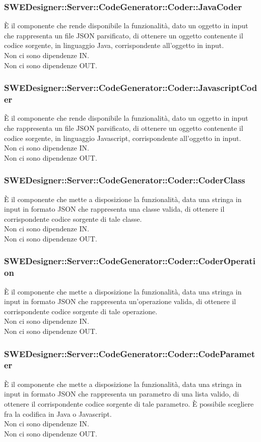 \documentclass[../PianoDiQualifica.tex]{subfiles}
\begin{document}
		\subsubsection{SWEDesigner::Server::CodeGenerator::Coder::JavaCoder}
		È il componente che rende disponibile la funzionalità, dato un oggetto in input che rappresenta un file JSON parsificato, di ottenere un oggetto contenente il codice sorgente, in linguaggio Java, corrispondente all'oggetto in input.\\
		Non ci sono dipendenze IN.\\
		Non ci sono dipendenze OUT.
		\subsubsection{SWEDesigner::Server::CodeGenerator::Coder::JavascriptCoder}
		È il componente che rende disponibile la funzionalità, dato un oggetto in input che rappresenta un file JSON parsificato, di ottenere un oggetto contenente il codice sorgente, in linguaggio Javascript, corrispondente all'oggetto in input.\\
		Non ci sono dipendenze IN.\\
		Non ci sono dipendenze OUT.
		\subsubsection{SWEDesigner::Server::CodeGenerator::Coder::CoderClass}
		È il componente che mette a disposizione la funzionalità, data una stringa in input in formato JSON che rappresenta una classe valida, di ottenere il corrispondente codice sorgente di tale classe.\\
		Non ci sono dipendenze IN.\\
		Non ci sono dipendenze OUT.
		\subsubsection{SWEDesigner::Server::CodeGenerator::Coder::CoderOperation}
		È il componente che mette a disposizione la funzionalità, data una stringa in input in formato JSON che rappresenta un'operazione valida, di ottenere il corrispondente codice sorgente di tale operazione.\\
		Non ci sono dipendenze IN.\\
		Non ci sono dipendenze OUT.
		\subsubsection{SWEDesigner::Server::CodeGenerator::Coder::CodeParameter}
		È il componente che mette a disposizione la funzionalità, data una stringa in input in formato JSON che rappresenta un parametro di una lista valido, di ottenere il corrispondente codice sorgente di tale parametro. È possibile scegliere fra la codifica in Java o Javascript.\\
		Non ci sono dipendenze IN.\\
		Non ci sono dipendenze OUT.
\end{document}
